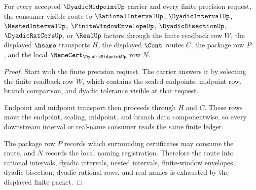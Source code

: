 \begin{theorem}
\label{thm:dyadic-midpoint-finite-window-consumer-route}
For every accepted $\DyadicMidpointUp$ carrier and every finite precision request, the consumer-visible route to $\RationalIntervalUp$, $\DyadicIntervalUp$, $\NestedIntervalUp$, $\FiniteWindowEnvelopeUp$, $\DyadicBisectionUp$, $\DyadicRatCoreUp$, or $\RealUp$ factors through the finite readback row $W$, the displayed $\hsame$ transports $H$, the displayed $\Cont$ routes $C$, the package row $P$, and the local $\NameCert_{\DyadicMidpointUp}$ row $N$.
\end{theorem}
\begin{proof}
Start with the finite precision request. The carrier answers it by selecting the finite readback row $W$, which contains the scaled endpoints, midpoint row, branch comparison, and dyadic tolerance visible at that request.

Endpoint and midpoint transport then proceeds through $H$ and $C$. These rows move the endpoint, scaling, midpoint, and branch data componentwise, so every downstream interval or real-name consumer reads the same finite ledger.

The package row $P$ records which surrounding certificates may consume the route, and $N$ records the local naming registration. Therefore the route into rational intervals, dyadic intervals, nested intervals, finite-window envelopes, dyadic bisection, dyadic rational rows, and real names is exhausted by the displayed finite packet.
\end{proof}

